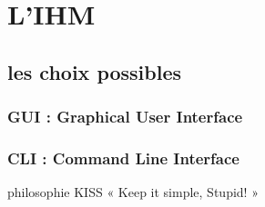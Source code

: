 \section{L'IHM}	
	\subsection{les choix possibles}
			\subsubsection{GUI : \og Graphical User Interface \fg{}}
			\subsubsection{CLI : \og Command Line Interface \fg{}}
				philosophie KISS « Keep it simple, Stupid! »
